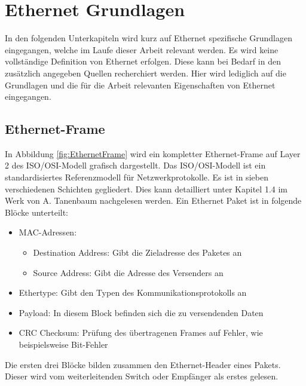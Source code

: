 \section{Ethernet Grundlagen}
In den folgenden Unterkapiteln wird kurz auf Ethernet spezifische Grundlagen eingegangen, welche im Laufe dieser Arbeit relevant werden. Es wird keine vollständige Definition von Ethernet erfolgen. Diese kann bei Bedarf in den zusätzlich angegeben Quellen recherchiert werden. Hier wird lediglich auf die Grundlagen und die für die Arbeit relevanten Eigenschaften von Ethernet eingegangen. 
\subsection{Ethernet-Frame}\label{sec:Ethernet}
In Abbildung \ref{fig:EthernetFrame} wird ein kompletter Ethernet-Frame auf Layer 2 des \acs{ISO}/\acs{OSI}-Modell grafisch dargestellt. Das \acs{ISO}/\acs{OSI}-Modell ist ein standardisiertes Referenzmodell für Netzwerkprotokolle. Es ist in sieben verschiedenen Schichten gegliedert. Dies kann detailliert unter Kapitel 1.4 im Werk von A. Tanenbaum nachgelesen werden\cite{ComputerNetworking}.\newline
Ein Ethernet Paket ist in folgende Blöcke unterteilt:
\newpage
\begin{itemize}
	\renewcommand{\labelitemi}{$\bullet$}
	\renewcommand{\labelitemii}{\scriptsize$\blacksquare$}
	\item MAC-Adressen:
	\begin{itemize}
		\item Destination Address: Gibt die Zieladresse des Paketes an
		\item Source Address: Gibt die Adresse des Versenders an
	\end{itemize}
	\item Ethertype: Gibt den Typen des Kommunikationsprotokolls an \cite{EthernetType}
	\item Payload: In diesem Block befinden sich die zu versendenden Daten
	\item CRC Checksum: Prüfung des übertragenen Frames auf Fehler, wie beispielsweise Bit-Fehler
\end{itemize}


Die ersten drei Blöcke bilden zusammen den Ethernet-Header eines Pakets. Dieser wird vom weiterleitenden Switch oder Empfänger als erstes gelesen.

